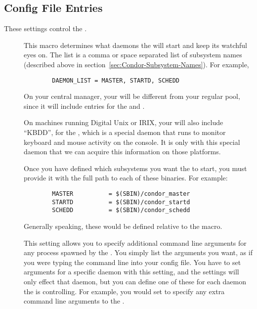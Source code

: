 \subsection{\label{sec:Master-Config-File-Entries}
 Config File Entries}

These settings control the .
\begin{description}
  
\item[] \label{param:DaemonList} This macro
  determines what daemons the  will start and keep its
  watchful eyes on.  The list is a comma or space separated list of
  subsystem names (described above in
  section~\ref{sec:Condor-Subsystem-Names}).  For example,
\begin{verbatim}
        DAEMON_LIST = MASTER, STARTD, SCHEDD
\end{verbatim}

  \Note On your central manager, your 
  will be different from your regular pool, since it will include
  entries for the  and .  
  
  \Note On machines running Digital Unix or IRIX, your
   will also include ``KBDD'', for the
  , which is a special daemon that runs to monitor
  keyboard and mouse activity on the console.  It is only with this
  special daemon that we can acquire this information on those
  platforms. 

\item[] \label{param:SUBSYS} Once you have defined which
  subsystems you want the  to start, you must provide
  it with the full path to each of these binaries.  For example:
\begin{verbatim}
        MASTER          = $(SBIN)/condor_master
        STARTD          = $(SBIN)/condor_startd
        SCHEDD          = $(SBIN)/condor_schedd
\end{verbatim}
  Generally speaking, these would be defined relative to the
   macro.
  
\item[] \label{param:SubsysArgs} This setting
  allows you to specify additional command line arguments for any
  process spawned by the .
  You simply list the arguments you want, as if you were typing the
  command line into your config file.  
  You have to set arguments for a specific daemon with this setting,
  and the settings will only effect that daemon, but you can define
  one of these for each daemon the  is controlling.
  For example, you would set  to specify any extra
  command line arguments to the .


\end{description}
